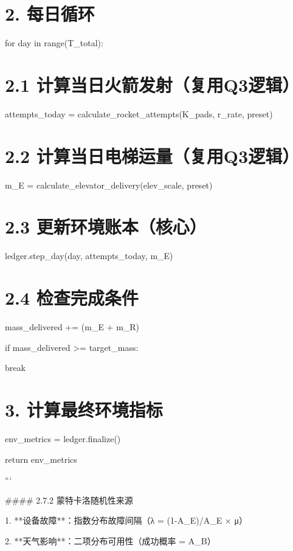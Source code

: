 \documentclass[a4paper,12pt]{article}
\begin{document}
\section{2. 每日循环}
for day in range(T\_total):

\par
\section{2.1 计算当日火箭发射（复用Q3逻辑）}
attempts\_today = calculate\_rocket\_attempts(K\_pads, r\_rate, preset)

\par
\section{2.2 计算当日电梯运量（复用Q3逻辑）}
m\_E = calculate\_elevator\_delivery(elev\_scale, preset)

\par
\section{2.3 更新环境账本（核心）}
ledger.step\_day(day, attempts\_today, m\_E)

\par
\section{2.4 检查完成条件}
mass\_delivered += (m\_E + m\_R)

\par
if mass\_delivered >= target\_mass:

\par
break

\par
\section{3. 计算最终环境指标}
env\_metrics = ledger.finalize()

\par
return env\_metrics

\par
```

\par
#### 2.7.2 蒙特卡洛随机性来源

\par
1. **设备故障**：指数分布故障间隔（λ = (1-A\_E)/A\_E × μ）

\par
2. **天气影响**：二项分布可用性（成功概率 = A\_B）
\end{document}
